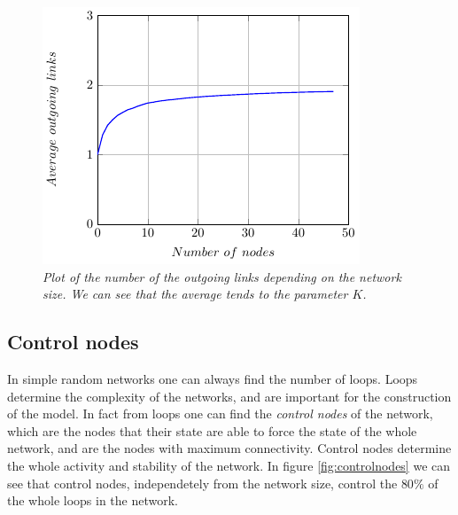\begin{figure}[H]
\centering
\includegraphics[scale=1.5]{images/outgoing.pdf}
\caption{\emph{Plot of the number of the outgoing links depending on the network size. We can see that the average tends to the parameter $K$. }}
\label{fig:outgoing}
\end{figure}



\subsection{Control nodes}
In simple random networks one can always find the number of loops.
Loops determine the complexity of the networks\cite{K38}, and are important for the construction of the model. In fact from loops one can find the \emph{control nodes} of the network, which are the nodes that their state are able to force the state of the whole network, and are the nodes with maximum connectivity. Control nodes determine the whole activity and stability of the network. 
In figure \ref{fig:controlnodes} we can see that control nodes, independetely from the network size, control the $80\%$ of the whole loops in the network.


